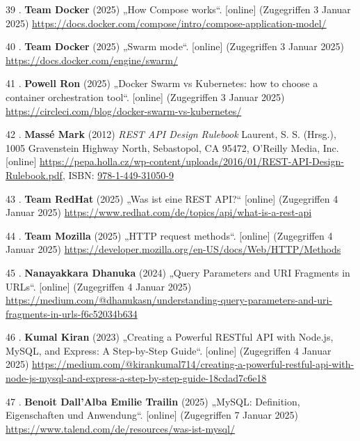 \documentclass[
    headings=optiontotocandhead,%
    twoside,
    numbers=noenddot,%
    12pt, %
    titlepage, %
    parskip=full, %
    listof=leveldown, 
    numbers=noenddot, %
    a4paper,DIV=14,
    BCOR=15mm,
]{scrbook}
\newlength{\cslhangindent}
\newenvironment{cslreferences}%
  {\setlength{\parindent}{0pt}%
  \everypar{\setlength{\hangindent}{\cslhangindent}}\ignorespaces}%
  {\par}
\begin{document}
\begin{cslreferences}
\leavevmode\hypertarget{ref-docker-compose}{}%
39 . \textbf{Team Docker} (2025) „How Compose works``. {[}online{]}
(Zugegriffen 3 Januar 2025)
\url{https://docs.docker.com/compose/intro/compose-application-model/}

\leavevmode\hypertarget{ref-docker-swarm}{}%
40 . \textbf{Team Docker} (2025) „Swarm mode``. {[}online{]}
(Zugegriffen 3 Januar 2025) \url{https://docs.docker.com/engine/swarm/}

\leavevmode\hypertarget{ref-circleci-blog}{}%
41 . \textbf{Powell Ron} (2025) „Docker Swarm vs Kubernetes: how to
choose a container orchestration tool``. {[}online{]} (Zugegriffen 3
Januar 2025) \url{https://circleci.com/blog/docker-swarm-vs-kubernetes/}

\leavevmode\hypertarget{ref-REST-API-Design-Rulebook}{}%
42 . \textbf{Massé Mark} (2012) \emph{REST API Design Rulebook} Laurent,
S. S. (Hrsg.), 1005 Gravenstein Highway North, Sebastopol, CA 95472,
O'Reilly Media, Inc. {[}online{]}
\url{https://pepa.holla.cz/wp-content/uploads/2016/01/REST-API-Design-Rulebook.pdf},
ISBN:
\href{https://worldcat.org/isbn/978-1-449-31050-9}{978-1-449-31050-9}

\leavevmode\hypertarget{ref-redhat-rest}{}%
43 . \textbf{Team RedHat} (2025) „Was ist eine REST API?{}``
{[}online{]} (Zugegriffen 4 Januar 2025)
\url{https://www.redhat.com/de/topics/api/what-is-a-rest-api}

\leavevmode\hypertarget{ref-mozilla-rest}{}%
44 . \textbf{Team Mozilla} (2025) „HTTP request methods``. {[}online{]}
(Zugegriffen 4 Januar 2025)
\url{https://developer.mozilla.org/en-US/docs/Web/HTTP/Methods}

\leavevmode\hypertarget{ref-medium-uri-fragment}{}%
45 . \textbf{Nanayakkara Dhanuka} (2024) „Query Parameters and URI
Fragments in URLs``. {[}online{]} (Zugegriffen 4 Januar 2025)
\url{https://medium.com/@dhanukasn/understanding-query-parameters-and-uri-fragments-in-urls-f6c52034b634}

\leavevmode\hypertarget{ref-medium-rest-api}{}%
46 . \textbf{Kumal Kiran} (2023) „Creating a Powerful RESTful API with
Node.js, MySQL, and Express: A Step-by-Step Guide``. {[}online{]}
(Zugegriffen 4 Januar 2025)
\url{https://medium.com/@kirankumal714/creating-a-powerful-restful-api-with-node-js-mysql-and-express-a-step-by-step-guide-18cdad7c6e18}

\leavevmode\hypertarget{ref-talend-mysql}{}%
47 . \textbf{Benoit Dall'Alba Emilie Trailin} (2025) „MySQL: Definition,
Eigenschaften und Anwendung``. {[}online{]} (Zugegriffen 7 Januar 2025)
\url{https://www.talend.com/de/resources/was-ist-mysql/}


\end{cslreferences}
\end{document}
